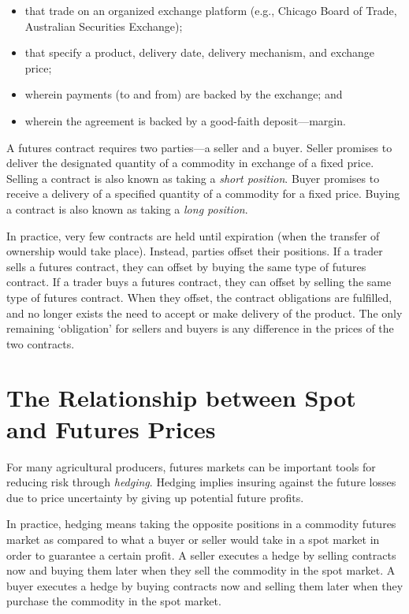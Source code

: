 \documentclass[
]{book}
\providecommand{\tightlist}{%
  \setlength{\itemsep}{0pt}\setlength{\parskip}{0pt}}
\begin{document}
\begin{itemize}
\tightlist
\item
  that trade on an organized exchange platform (e.g., Chicago Board of Trade, Australian Securities Exchange);
\item
  that specify a product, delivery date, delivery mechanism, and exchange price;
\item
  wherein payments (to and from) are backed by the exchange; and
\item
  wherein the agreement is backed by a good-faith deposit---margin.
\end{itemize}

A futures contract requires two parties---a seller and a buyer. Seller promises to deliver the designated quantity of a commodity in exchange of a fixed price. Selling a contract is also known as taking a \emph{short position}. Buyer promises to receive a delivery of a specified quantity of a commodity for a fixed price. Buying a contract is also known as taking a \emph{long position}.

In practice, very few contracts are held until expiration (when the transfer of ownership would take place). Instead, parties offset their positions. If a trader sells a futures contract, they can offset by buying the same type of futures contract. If a trader buys a futures contract, they can offset by selling the same type of futures contract. When they offset, the contract obligations are fulfilled, and no longer exists the need to accept or make delivery of the product. The only remaining `obligation' for sellers and buyers is any difference in the prices of the two contracts.

\hypertarget{the-relationship-between-spot-and-futures-prices}{%
\section{The Relationship between Spot and Futures Prices}\label{the-relationship-between-spot-and-futures-prices}}

For many agricultural producers, futures markets can be important tools for reducing risk through \emph{hedging}. Hedging implies insuring against the future losses due to price uncertainty by giving up potential future profits.

In practice, hedging means taking the opposite positions in a commodity futures market as compared to what a buyer or seller would take in a spot market in order to guarantee a certain profit. A seller executes a hedge by selling contracts now and buying them later when they sell the commodity in the spot market. A buyer executes a hedge by buying contracts now and selling them later when they purchase the commodity in the spot market.
\end{document}
